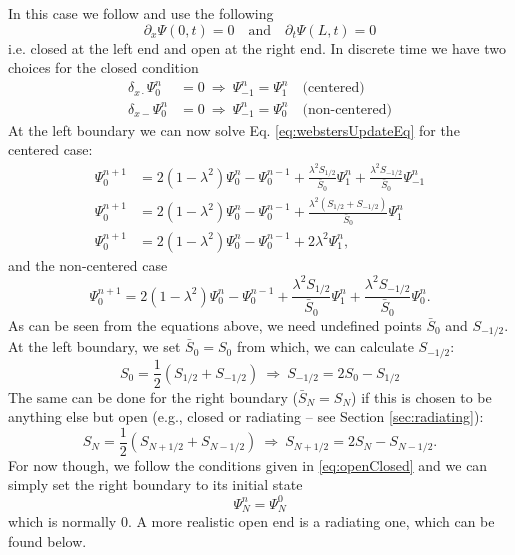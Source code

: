 In this case we follow \cite[Chapter 9]{theBible} and use the following
\begin{equation}\label{eq:openClosed}
    \partial_x\Psi(0, t) = 0 \quad \text{and} \quad \partial_t\Psi(L, t) = 0
\end{equation}
i.e. closed at the left end and open at the right end. In discrete time we have two choices for the closed condition
\begin{equation}\label{eq:centNonCentBound}
\begin{split}
    \delta_{x\cdot}\Psi_0^n &= 0 \ \Rightarrow \ \Psi_{-1}^n = \Psi_1^n \quad \text{(centered)}\\
    \delta_{x-}\Psi_0^n &= 0\  \Rightarrow \ \Psi_{-1}^n = \Psi_0^n\quad \text{(non-centered)}
\end{split}
\end{equation}
At the left boundary we can now solve Eq. \eqref{eq:webstersUpdateEq} for the centered case:
\begin{equation}
    \begin{aligned}
        \Psi_0^{n+1} &= 2(1-\lambda^2)\Psi_0^n-\Psi_0^{n-1}+ \frac{\lambda^2S_{1/2}}{\bar S_0}\Psi_1^n + \frac{\lambda^2S_{-1/2}}{\bar S_0}\Psi_{-1}^n\nonumber\\
        \Psi_0^{n+1} &= 2(1-\lambda^2)\Psi_0^n-\Psi_0^{n-1}+ \frac{\lambda^2(S_{1/2}+S_{-1/2})}{\bar S_0}\Psi_1^n\nonumber\\
         \Psi_0^{n+1} &= 2(1-\lambda^2)\Psi_0^n-\Psi_0^{n-1}+ 2\lambda^2\Psi_1^n,
    \end{aligned}
\end{equation}
and the non-centered case
\begin{equation}\label{eq:nonCentLeft}
    \Psi_0^{n+1} = 2(1-\lambda^2)\Psi_0^n-\Psi_0^{n-1}+ \frac{\lambda^2S_{1/2}}{\bar S_0}\Psi_1^n + \frac{\lambda^2S_{-1/2}}{\bar S_0}\Psi_0^n.
\end{equation}
As can be seen from the equations above, we need undefined points $\bar S_0$ and $S_{-1/2}$. At the left boundary, we set $\bar S_0 = S_0$ from which, we can calculate $S_{-1/2}$:
\begin{equation}
        S_0 = \frac{1}{2}(S_{1/2} + S_{-1/2}) \ \Rightarrow \  S_{-1/2}
        = 2S_0 - S_{1/2}
\end{equation}
The same can be done for the right boundary ($\bar S_N = S_N$) if this is chosen to be anything else but open (e.g., closed or radiating -- see Section \ref{sec:radiating}):
\begin{equation}
    S_N = \frac{1}{2}(S_{N+1/2} + S_{N-1/2}) \ \Rightarrow \ S_{N+1/2} = 2S_N - S_{N-1/2}.
\end{equation}
For now though, we follow the conditions given in \eqref{eq:openClosed} and we can simply set the right boundary to its initial state
\begin{equation}
    \Psi_N^n = \Psi_N^0
\end{equation}
which is normally $0$. A more realistic open end is a radiating one, which can be found below.
